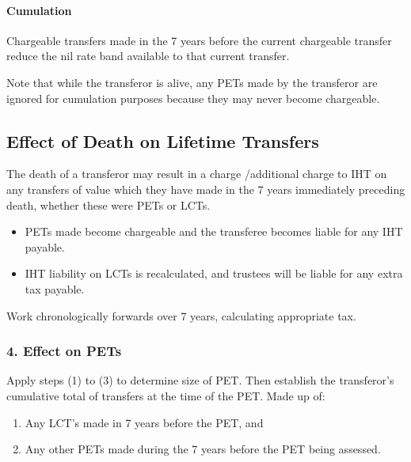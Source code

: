 \documentclass[
]{article}
\newenvironment{Shaded}{}{}
\newcommand{\NormalTok}[1]{#1}
\providecommand{\tightlist}{%
  \setlength{\itemsep}{0pt}\setlength{\parskip}{0pt}}
\begin{document}
\hypertarget{cumulation-1}{%
\paragraph{Cumulation}\label{cumulation-1}}

\begin{Shaded}
\begin{Highlighting}[]
\NormalTok{Chargeable transfers made in the 7 years before the current chargeable transfer reduce the nil rate band available to that current transfer. }
\end{Highlighting}
\end{Shaded}

Note that while the transferor is alive, any PETs made by the transferor
are ignored for cumulation purposes because they may never become
chargeable.

\hypertarget{effect-of-death-on-lifetime-transfers}{%
\subsection{Effect of Death on Lifetime
Transfers}\label{effect-of-death-on-lifetime-transfers}}

The death of a transferor may result in a charge /additional charge to
IHT on any transfers of value which they have made in the 7 years
immediately preceding death, whether these were PETs or LCTs.

\begin{itemize}
\tightlist
\item
  PETs made become chargeable and the transferee becomes liable for any
  IHT payable.
\item
  IHT liability on LCTs is recalculated, and trustees will be liable for
  any extra tax payable.
\end{itemize}

Work chronologically forwards over 7 years, calculating appropriate tax.

\hypertarget{effect-on-pets}{%
\subsubsection{4. Effect on PETs}\label{effect-on-pets}}

Apply steps (1) to (3) to determine size of PET. Then establish the
transferor's cumulative total of transfers at the time of the PET. Made
up of:

\begin{enumerate}
\def\labelenumi{\arabic{enumi}.}
\tightlist
\item
  Any LCT's made in 7 years before the PET, and
\item
  Any other PETs made during the 7 years before the PET being assessed.
\end{enumerate}
\end{document}
